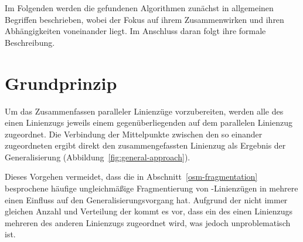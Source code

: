 \documentclass[../main/thesis.tex]{subfiles}
\begin{document}




Im Folgenden werden die gefundenen Algorithmen zunächst in allgemeinen Begriffen beschrieben, wobei der Fokus auf ihrem Zusammenwirken und ihren Abhängigkeiten voneinander liegt. Im Anschluss daran folgt ihre formale Beschreibung.


\section{Grundprinzip}

Um das Zusammenfassen paralleler Linienzüge vorzubereiten, werden alle  des einen Linienzugs jeweils einem gegenüberliegenden  auf dem parallelen Linienzug zugeordnet.
Die Verbindung der Mittelpunkte zwischen den so einander zugeordneten  ergibt direkt den zusammengefassten Linienzug als Ergebnis der Generalisierung (Abbildung~\ref{fig:general-approach}).

Dieses Vorgehen vermeidet, dass die in Abschnitt~\ref{osm-fragmentation} besprochene häufige ungleichmäßige Fragmentierung von \osm-Linienzügen in mehrere  einen Einfluss auf den Generalisierungsvorgang hat.
Aufgrund der nicht immer gleichen Anzahl und Verteilung der  kommt es vor, dass ein  des einen Linienzugs mehreren  des anderen Linienzugs zugeordnet wird, was jedoch unproblematisch ist.
\end{document}
